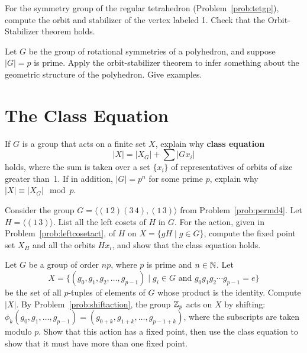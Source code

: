 \begin{problem}\label{prob:tetraorbit}
For the symmetry group of the regular tetrahedron (Problem~\ref{prob:tetgp}), compute the orbit and stabilizer of the vertex labeled 1. Check that the Orbit-Stabilizer theorem holds.
\end{problem}

\begin{problem}
Let $G$ be the group of rotational symmetries of a polyhedron, and suppose $\lvert G \rvert = p$ is prime.  Apply the orbit-stabilizer theorem to infer something about the geometric structure of the polyhedron.  Give examples.
\end{problem}

\section{The Class Equation}

\begin{problem}\label{prob:classequation}
If $G$ is a group that acts on a finite set $X$, explain why \textbf{class equation}
$$\lvert X \rvert = \lvert X_G \rvert + \sum \lvert G{x_i}\rvert$$
holds, where the sum is taken over a set $\{x_i\}$ of representatives of orbits of size greater than~1.  If in addition, $\lvert G \rvert=p^n$ for some prime $p$, explain why $\lvert X \rvert \equiv \lvert X_G \rvert \mod p$.
\begin{annotation}
\end{annotation}
\end{problem}

\begin{problem}
Consider the group $G=\langle (1\,2)(3\,4), (1\,3) \rangle$ from Problem~\ref{prob:permd4}. Let $H = \langle (1\,3) \rangle$. List all the left cosets of $H$ in $G$. For the action, given in Problem~\ref{prob:leftcosetact}, of $H$ on $X = \{gH \mid g\in G\}$, compute the fixed point set $X_H$ and all the orbits $Hx_i$, and show that the class equation holds.
\end{problem}

\begin{problem}
Let $G$ be a group of order $np$, where $p$ is prime and $n\in\mathbb{N}$. Let
$$X = \{(g_0,g_1,g_2,\ldots,g_{p-1}) \mid g_i\in G \text{ and } g_0g_1g_2\cdots g_{p-1} = e\}$$
be the set of all $p$-tuples of elements of $G$ whose product is the identity. Compute $|X|$. By Problem~\ref{prob:shiftaction}, the group $\mathbb{Z}_p$ acts on $X$ by shifting: $\phi_k(g_0,g_1,\ldots,g_{p-1}) = (g_{0+k}, g_{1+k}, \ldots, g_{p-1+k})$, where the subscripts are taken modulo $p$. Show that this action has a fixed point, then use the class equation to show that it must have more than one fixed point.
\end{problem}


